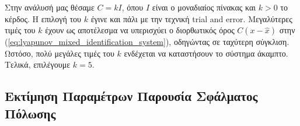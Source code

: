 \documentclass[a4paper,12pt]{article}
\begin{document}
Στην ανάλυσή μας θέσαμε $C = k I$, όπου $I$ είναι ο μοναδιαίος πίνακας και $k > 0$ το κέρδος. 
Η επιλογή του $k$ έγινε και πάλι με την τεχνική 
trial and error. Μεγαλύτερες τιμές του $k$ έχουν ως 
αποτέλεσμα να υπερισχύει ο διορθωτικός όρος $C(x - \hat{x})$ στην 
(\ref{eq:lyapunov_mixed_identification_system}), οδηγώντας σε ταχύτερη σύγκλιση. Ωστόσο, πολύ μεγάλες τιμές 
του $k$ ενδέχεται να καταστήσουν το σύστημα άκαμπτο. Τελικά, επιλέγουμε $k = 5$.

\subsection*{Εκτίμηση Παραμέτρων Παρουσία Σφάλματος Πόλωσης}
\end{document}
